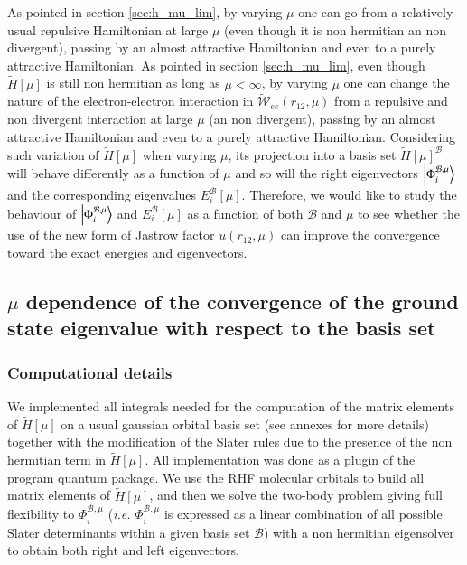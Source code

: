 \documentclass[aip,jcp,reprint,noshowkeys,superscriptaddress]{revtex4-1}
\newcommand{\phiimub}[0]{\Phi^{\mathcal{B},\mu}_i}
\newcommand{\basis}[0]{\mathcal{B}}
\begin{document}
As pointed in section \ref{sec:h_mu_lim}, by varying $\mu$ one can go from a relatively usual repulsive Hamiltonian at large $\mu$ (even though it is non hermitian an non divergent), passing by an almost attractive Hamiltonian and even to a purely attractive Hamiltonian. 
As pointed in section \ref{sec:h_mu_lim}, even though $\tilde{H}[\mu]$ is still non hermitian as long as $\mu < \infty$, by varying $\mu$ one can change the nature of the electron-electron interaction in $\tilde{\mathcal{W}}_{ee}(r_{12},\mu)$ from a repulsive and non divergent interaction at large $\mu$ (an non divergent), passing by an almost attractive Hamiltonian and even to a purely attractive Hamiltonian. 
Considering such variation of $\tilde{H}[\mu]$ when varying $\mu$,  
its projection into a basis set $\tilde{H}[\mu]^{\basis}$ will behave differently as a function of $\mu$ 
and so will the right eigenvectors $\ket{\phiimub}$ and the corresponding eigenvalues $E_i^{\basis}[\mu]$. 
Therefore, we would like to study the behaviour of $\ket{\phiimub}$ and $E_i^{\basis}[\mu]$ as a function of both $\basis$ and $\mu$ to see whether the use of the new form of Jastrow factor $u(r_{12},\mu)$ can improve the convergence toward the exact energies  and eigenvectors. 
\subsection{$\mu$ dependence of the convergence of the ground state eigenvalue with respect to the basis set }
\subsubsection{Computational details}
We implemented all integrals needed for the computation of the matrix elements of $\tilde{H}[\mu]$ on a usual gaussian orbital basis set (see annexes for more details) together with the modification of the Slater rules due to the presence of the non hermitian term in $\tilde{H}[\mu]$. 
All implementation was done as a plugin of the program quantum package\cite{QP2}. 
We use the RHF molecular orbitals to build all matrix elements of $\tilde{H}[\mu]$, and then we solve the two-body problem giving full flexibility to $\phiimub$ (\textit{i.e.} $\phiimub$ is expressed as a linear combination of all possible Slater determinants within a given basis set $\basis$) with a non hermitian eigensolver to obtain both right and left eigenvectors. 
\end{document}
